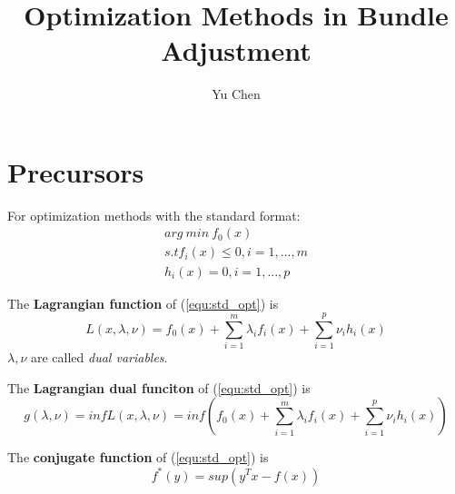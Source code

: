 \documentclass[runningheads]{llncs}
\begin{document}
%
\title{Optimization Methods in Bundle Adjustment}
%
%
\author{Yu Chen}
%
%
%
\maketitle              %
%

%
%
%
\section{Precursors}

For optimization methods with the standard format:
\begin{equation}
    \label{equ:std_opt}
	\begin{align}
	    arg\ min\ f_0(x) \\
    s.t f_i(x) \leq 0, i=1,...,m\\
    h_i(x) = 0, i=1,...,p
	\end{align}
\end{equation}

The \textbf{Lagrangian function} of (\ref{equ:std_opt}) is 
\begin{equation}
L(x,\lambda, \nu) = f_0(x) + \sum_{i=1}^m \lambda_i f_i(x) + \sum_{i=1}^p \nu_i h_i(x)
\end{equation}
$\lambda, \nu$ are called \textit{dual variables}.

The \textbf{Lagrangian dual funciton} of (\ref{equ:std_opt}) is
\begin{equation}
g(\lambda, \nu)=inf L(x,\lambda,\nu) = inf (f_0(x) + \sum_{i=1}^m \lambda_if_i(x) + \sum_{i=1}^p \nu_ih_i(x))
\end{equation}

The \textbf{conjugate function} of (\ref{equ:std_opt}) is
\begin{equation}
f^*(y)=sup (y^Tx-f(x))
\end{equation}
\end{document}
